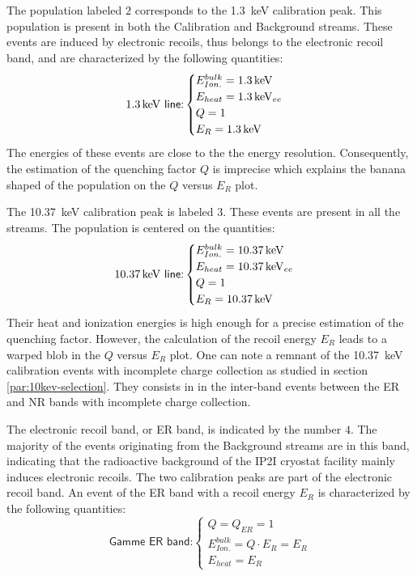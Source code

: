 The population labeled $2$ corresponds to the \SI{1.3}{\kilo\eV} calibration peak. This population is present in both the Calibration and Background streams. These events are induced by electronic recoils, thus belongs to the electronic recoil band, and are characterized by the following quantities:
\begin{equation}
\textsf{\SI{1.3}{\kilo\eV} line:}
\begin{cases}
E_{Ion.}^{bulk} = \SI{1.3}{\kilo\eV} \\
E_{heat} = \SI{1.3}{\kilo\eV}_{ee} \\
Q = 1 \\
E_R = \SI{1.3}{\kilo\eV}
\end{cases}
\end{equation}
The energies of these events are close to the the energy resolution. Consequently, the estimation of the quenching factor $Q$ is imprecise which explains the banana shaped of the population on the $Q$ versus $E_R$ plot.

The \SI{10.37}{\kilo\eV} calibration peak is labeled $3$. These events are present in all the streams. The population is centered on the quantities:
\begin{equation}
\textsf{\SI{10.37}{\kilo\eV} line:}
\begin{cases}
E_{Ion.}^{bulk} = \SI{10.37}{\kilo\eV} \\
E_{heat} = \SI{10.37}{\kilo\eV}_{ee} \\
Q = 1 \\
E_R = \SI{10.37}{\kilo\eV}
\end{cases}
\end{equation}
Their heat and ionization energies is high enough for a precise estimation of the quenching factor. However, the calculation of the recoil energy $E_R$ leads to a warped blob in the $Q$ versus $E_R$ plot. 
One can note a remnant of the \SI{10.37}{\kilo\eV} calibration events with incomplete charge collection as studied in section \ref{par:10kev-selection}. They consists in in the inter-band events between the ER and NR bands with incomplete charge collection.

The electronic recoil band, or ER band, is indicated by the number $4$. The majority of the events originating from the Background streams are in this band, indicating that the radioactive background of the IP2I cryostat facility mainly induces electronic recoils. The two calibration peaks are part of the electronic recoil band. An event of the ER band with a recoil energy $E_R$ is characterized by the following quantities:
\begin{equation}
\label{eq:er-band}
\textsf{Gamme ER band:}
\begin{cases}
Q = Q_{ER} = 1 \\
E_{Ion.}^{bulk} = Q \cdot E_R = E_R \\
E_{heat} = E_R
\end{cases}
\end{equation}

